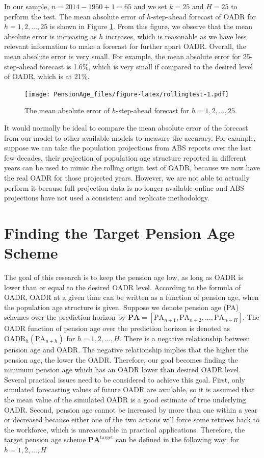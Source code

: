 \documentclass[11pt,a4paper,]{article}
\begin{document}
In our sample, \(n=2014-1950+1=65\) and we set \(k=25\) and \(H=25\) to
perform the test. The mean absolute error of \(h\)-step-ahead forecast
of OADR for \(h=1,2,\dots,25\) is shown in Figure \ref{fig:rollingtest}.
From this figure, we observe that the mean absolute error is increasing
as \(h\) increases, which is reasonable as we have less relevant
information to make a forecast for further apart OADR. Overall, the mean
absolute error is very small. For example, the mean absolute error for
25-step-ahead forecast is 1.6\%, which is very small if compared to the
desired level of OADR, which is at 21\%.

\begin{figure}
\centering
\texttt{[image: PensionAge\_files/figure-latex/rollingtest-1.pdf]}
\caption{\label{fig:rollingtest}The mean absolute error of \(h\)-step-ahead
forecast for \(h=1,2,\dots,25\).}
\end{figure}

It would normally be ideal to compare the mean absolute error of the
forecast from our model to other available models to measure the
accuracy. For example, suppose we can take the population projections
from ABS reports over the last few decades, their projection of
population age structure reported in different years can be used to
mimic the rolling origin test of OADR, because we now have the real OADR
for those projected years. However, we are not able to actually perform
it because full projection data is no longer available online and ABS
projections have not used a consistent and replicate methodology.

\section{Finding the Target Pension Age Scheme}\label{sec:target}

The goal of this research is to keep the pension age low, as long as
OADR is lower than or equal to the desired OADR level. According to the
formula of OADR, OADR at a given time can be written as a function of
pension age, when the population age structure is given. Suppose we
denote pension age (PA) schemes over the prediction horizon by
\(\bm{\text{PA}}=[\text{PA}_{n+1}, \text{PA}_{n+2},\dots,\text{PA}_{n+H}]\).
The OADR function of pension age over the prediction horizon is denoted
as \(\text{OADR}_h(\text{PA}_{n+h})\) for \(h=1,2,\dots,H\). There is a
negative relationship between pension age and OADR. The negative
relationship implies that the higher the pension age, the lower the
OADR. Therefore, our goal becomes finding the minimum pension age which
has an OADR lower than desired OADR level. Several practical issues need
to be considered to achieve this goal. First, only simulated forecasting
values of future OADR are available, so it is assumed that the mean
value of the simulated OADR is a good estimate of true underlying OADR.
Second, pension age cannot be increased by more than one within a year
or decreased because either one of the two actions will force some
retirees back to the workforce, which is unreasonable in practical
applications. Therefore, the target pension age scheme
\(\bm{\text{PA}}^{\text{target}}\) can be defined in the following way:
for \(h=1,2,\dots,H\)
\end{document}
